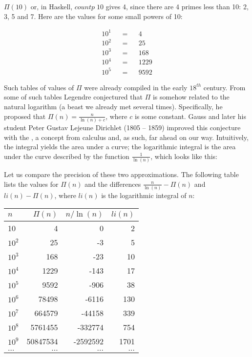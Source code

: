 \documentclass{scrreprt}
\newcommand{\Varid}[1]{\mathit{#1}}
\begin{document}
$\Pi(10)$ or, in Haskell, \ensuremath{\Varid{countp}\;\mathrm{10}}
gives 4, since there are 4 primes less than 10:
2, 3, 5 and 7. Here are the values for 
some small powers of 10:

\begin{align*}
10^1 & & = & & 4\\
10^2 & & = & & 25\\
10^3 & & = & & 168\\
10^4 & & = & & 1229\\
10^5 & & = & & 9592
\end{align*}

Such tables of values of $\Pi$
were already compiled in the early $18^{th}$ century.
From some of such tables Legendre conjectured
that $\Pi$ is somehow related to the
natural logarithm (a beast we already met
several times).
Specifically, he proposed that 
$\Pi(n) = \frac{n}{\ln(n) + c}$,
where $c$ is some constant.
Gauss and later his student 
Peter Gustav Lejeune Dirichlet (1805 -- 1859)
improved this conjecture with the 
, 
a concept from calculus and,
as such, far ahead on our way.
Intuitively, the integral yields
the area under a curve;
the logarithmic integral 
is the area under the curve described by
the function $\frac{1}{\ln(n)}$,
which looks like this:

\begin{center}
\end{center}

Let us compare the precision of these two approximations.
The following table lists the values for $\Pi(n)$
and the differences $\frac{n}{\ln(n)} - \Pi(n)$ and
$li(n) - \Pi(n)$, where $li(n)$ is the logarithmic integral of $n$:

\begin{center}
\begin{tabular}{|l|r|r|r|}
\hline
$n$     & $\Pi(n)$ & $n/\ln(n)$ & $li(n)$\\\hline\hline
10      &        4 &        0 &    2 \\\hline
$10^2$  &       25 &       -3 &    5 \\\hline
$10^3$  &      168 &      -23 &   10 \\\hline
$10^4$  &     1229 &     -143 &   17 \\\hline
$10^5$  &     9592 &     -906 &   38 \\\hline
$10^6$  &    78498 &    -6116 &  130 \\\hline
$10^7$  &   664579 &   -44158 &  339 \\\hline
$10^8$  &  5761455 &  -332774 &  754 \\\hline
$10^9$  & 50847534 & -2592592 & 1701 \\\hline
$\dots$ &  $\dots$ &  $\dots$ & $\dots$
\end{tabular}
\end{center}
\end{document}
